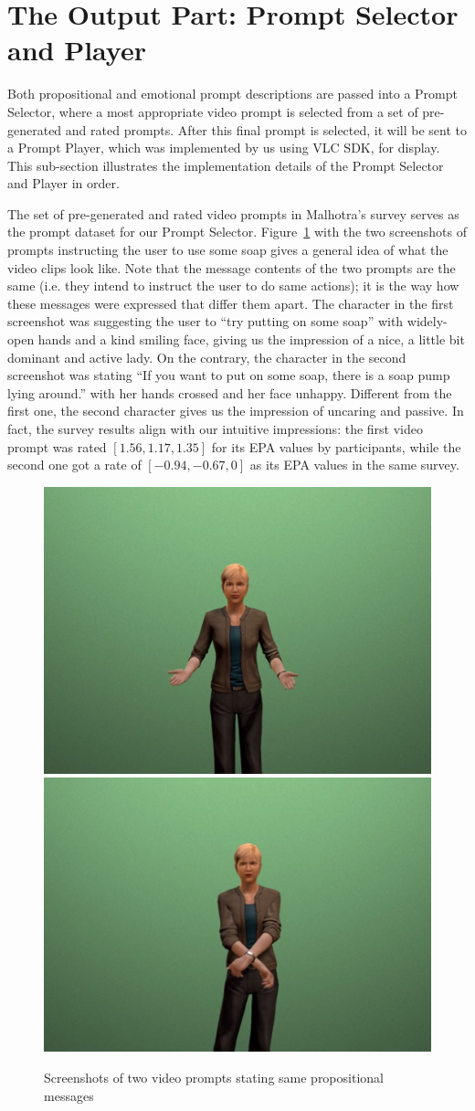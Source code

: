 \section{The Output Part: Prompt Selector and Player}

Both propositional and emotional prompt descriptions are passed into a Prompt Selector, where a most appropriate video prompt is selected from a set of pre- generated and rated prompts. After this final prompt is selected, it will be sent to a Prompt Player, which was implemented by us using VLC SDK, for display. This sub-section illustrates the implementation details of the Prompt Selector and Player in order.

The set of pre-generated and rated video prompts in Malhotra's survey \cite{malhotra2014} serves as the prompt dataset for our Prompt Selector. Figure~\ref{fig:sample-prompt} with the two screenshots of prompts instructing the user to use some soap gives a general idea of what the video clips look like. Note that the message contents of the two prompts are the same (i.e. they intend to instruct the user to do same actions); it is the way how these messages were expressed that differ them apart. The character in the first screenshot was suggesting the user to ``try putting on some soap'' with widely-open hands and a kind smiling face, giving us the impression of a nice, a little bit dominant and active lady. On the contrary, the character in the second screenshot was stating ``If you want to put on some soap, there is a soap pump lying around.'' with her hands crossed and her face unhappy. Different from the first one, the second character gives us the impression of uncaring and passive. In fact, the survey results align with our intuitive impressions: the first video prompt was rated $[1.56, 1.17, 1.35]$ for its EPA values by participants, while the second one got a rate of  $[-0.94, -0.67, 0]$ as its EPA values in the same survey.


%
\begin{figure}[p]
\centering
\includegraphics[width=0.45\linewidth]{fig/prompt1.png}
\includegraphics[width=0.45\linewidth]{fig/prompt2.png}
\caption{Screenshots of two video prompts stating same propositional messages}
\label{fig:sample-prompt}
\end{figure}

